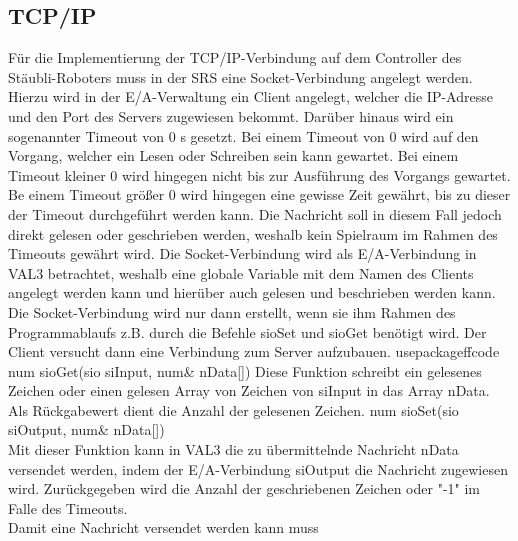 \documentclass[ a4paper,
                oneside,
                toc=bibliography,
                toc=listof
                ]{scrbook}
\begin{document}
	\subsection{TCP/IP}
	Für die Implementierung der TCP/IP-Verbindung auf dem Controller des Stäubli-Roboters muss in der SRS eine Socket-Verbindung angelegt werden. Hierzu wird in der E/A-Verwaltung ein Client angelegt, welcher die IP-Adresse und den Port des Servers zugewiesen bekommt. Darüber hinaus wird ein sogenannter Timeout von 0 s gesetzt. Bei einem Timeout von 0 wird auf den Vorgang, welcher ein Lesen oder Schreiben sein kann gewartet. Bei einem Timeout kleiner 0 wird hingegen nicht bis zur Ausführung des Vorgangs gewartet. Be einem Timeout größer 0 wird hingegen eine gewisse Zeit gewährt, bis zu dieser der Timeout durchgeführt werden kann. Die Nachricht soll in diesem Fall jedoch direkt gelesen oder geschrieben werden, weshalb kein Spielraum im Rahmen des Timeouts gewährt wird. \cite{VAL3} Die Socket-Verbindung wird als E/A-Verbindung in VAL3 betrachtet, weshalb eine globale Variable mit dem Namen des Clients angelegt werden kann und hierüber auch gelesen und beschrieben werden kann. Die Socket-Verbindung wird nur dann erstellt, wenn sie ihm Rahmen des Programmablaufs z.B. durch die Befehle sioSet und sioGet benötigt wird. Der Client versucht dann eine Verbindung zum Server aufzubauen.   usepackage{ffcode}\\
	num sioGet(sio siInput, num& nData[]) 
	Diese Funktion schreibt ein gelesenes Zeichen oder einen gelesen Array von Zeichen von siInput in das Array nData. Als Rückgabewert dient die Anzahl der gelesenen Zeichen.	
	num sioSet(sio siOutput, num& nData[]) \\
	Mit dieser Funktion kann in VAL3 die zu übermittelnde Nachricht nData versendet werden, indem der E/A-Verbindung siOutput die Nachricht zugewiesen wird. Zurückgegeben wird die Anzahl der geschriebenen Zeichen oder "-1" im Falle des Timeouts. \\
	Damit eine Nachricht versendet werden kann muss
	
	
   	
   	
   	\backmatter
   	
   	
   	\cleardoublepage
   	\listoffigures
   	\cleardoublepage
   	\listoftables
   	\cleardoublepage
   	
   	\cleardoublepage
   	\printbibliography
   	
   
\end{document}
